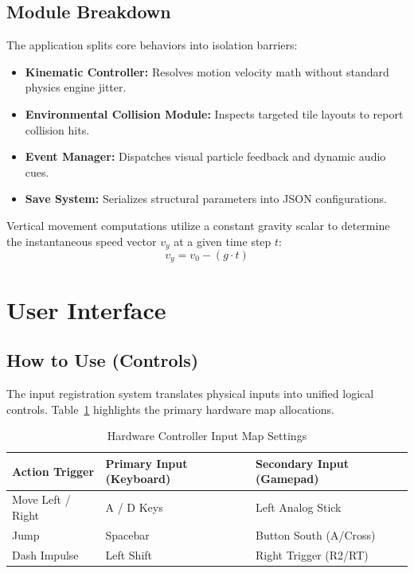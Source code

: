 \documentclass[runningheads]{llncs}
\begin{document}
\subsection{Module Breakdown}
The application splits core behaviors into isolation barriers:
\begin{itemize}
    \item \textbf{Kinematic Controller:} Resolves motion velocity math without standard physics engine jitter.
    \item \textbf{Environmental Collision Module:} Inspects targeted tile layouts to report collision hits.
    \item \textbf{Event Manager:} Dispatches visual particle feedback and dynamic audio cues.
    \item \textbf{Save System:} Serializes structural parameters into JSON configurations.
\end{itemize}

\noindent Vertical movement computations utilize a constant gravity scalar to determine the instantaneous speed vector $v_y$ at a given time step $t$:
\begin{equation}
v_y = v_0 - (g \cdot t)
\end{equation}


\section{User Interface}

\subsection{How to Use (Controls)}
The input registration system translates physical inputs into unified logical controls. Table~\ref{tab:controls} highlights the primary hardware map allocations.

\begin{table}[h]
\centering
\caption{Hardware Controller Input Map Settings}
\label{tab:controls}
\begin{tabular}{|l|l|l|}
\hline
\textbf{Action Trigger} & \textbf{Primary Input (Keyboard)} & \textbf{Secondary Input (Gamepad)} \\ \hline
Move Left / Right       & A / D Keys                        & Left Analog Stick                  \\ \hline
Jump                    & Spacebar                          & Button South (A/Cross)             \\ \hline
Dash Impulse            & Left Shift                        & Right Trigger (R2/RT)              \\ \hline
\end{tabular}
\end{table}
\end{document}
